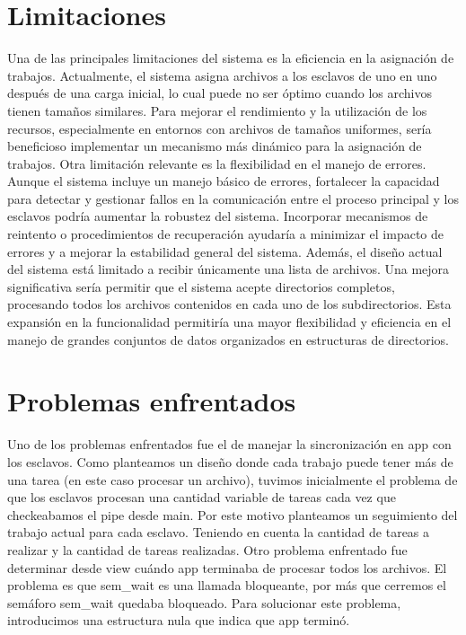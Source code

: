 \documentclass{article}
\begin{document}
\section{Limitaciones}
Una de las principales limitaciones del sistema es la eficiencia en la asignación de trabajos. Actualmente, el sistema asigna archivos a los esclavos de uno en uno después de una carga inicial, lo cual puede no ser óptimo cuando los archivos tienen tamaños similares. Para mejorar el rendimiento y la utilización de los recursos, especialmente en entornos con archivos de tamaños uniformes, sería beneficioso implementar un mecanismo más dinámico para la asignación de trabajos.
Otra limitación relevante es la flexibilidad en el manejo de errores. Aunque el sistema incluye un manejo básico de errores, fortalecer la capacidad para detectar y gestionar fallos en la comunicación entre el proceso principal y los esclavos podría aumentar la robustez del sistema. Incorporar mecanismos de reintento o procedimientos de recuperación ayudaría a minimizar el impacto de errores y a mejorar la estabilidad general del sistema.
Además, el diseño actual del sistema está limitado a recibir únicamente una lista de archivos. Una mejora significativa sería permitir que el sistema acepte directorios completos, procesando todos los archivos contenidos en cada uno de los subdirectorios. Esta expansión en la funcionalidad permitiría una mayor flexibilidad y eficiencia en el manejo de grandes conjuntos de datos organizados en estructuras de directorios.
\section{Problemas enfrentados}
Uno de los problemas enfrentados fue el de manejar la sincronización en app con los esclavos. Como planteamos un diseño donde cada trabajo puede tener más de una tarea (en este caso procesar un archivo), tuvimos inicialmente el problema de que los esclavos procesan una cantidad variable de tareas cada vez que checkeabamos el pipe desde main. Por este motivo planteamos un seguimiento del trabajo actual para cada esclavo. Teniendo en cuenta la cantidad de tareas a realizar y la cantidad de tareas realizadas.
Otro problema enfrentado fue determinar desde view cuándo app terminaba de procesar todos los archivos. El problema es que sem\_wait es una llamada bloqueante, por más que cerremos el semáforo sem\_wait quedaba bloqueado. Para solucionar este problema, introducimos una estructura nula que indica que app terminó.
\end{document}
